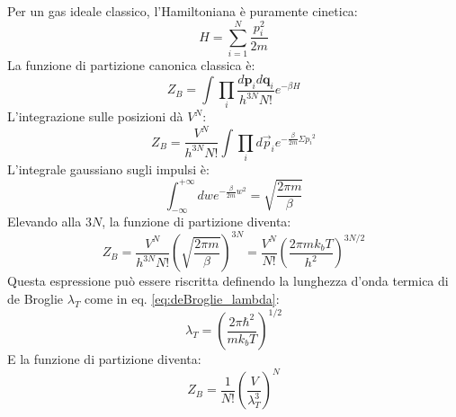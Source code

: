 Per un gas ideale classico, l'Hamiltoniana è puramente cinetica:
\begin{equation}
    H=\sum_{i=1}^{N}\frac{p_{i}^{2}}{2m}
    \label{eq:hamiltoniana_gas}
\end{equation}
La funzione di partizione canonica classica è:
\begin{equation}
    Z_{B}=\int\prod_{i}\frac{d\mathbf{p}_{i}d\mathbf{q}_{i}}{h^{3N}N!}e^{-\beta H}
    \label{eq:Z_B}
\end{equation}
L'integrazione sulle posizioni dà $V^N$:
\begin{equation}
    Z_{B}=\frac{V^{N}}{h^{3N}N!}\int\prod_{i}d\vec{p}_{i}e^{-\frac{\beta}{2m}\Sigma{p_{i}}^{2}}
    \label{eq:Z_B_V}
\end{equation}
L'integrale gaussiano sugli impulsi è:
\begin{equation}
    \int_{-\infty}^{+\infty}dwe^{-\frac{\beta}{2m}w^{2}}=\sqrt{\frac{2\pi m}{\beta}}
    \label{eq:gauss_integral}
\end{equation}
Elevando alla $3N$, la funzione di partizione diventa:
\begin{equation}
    Z_{B}=\frac{V^{N}}{h^{3N}N!}\left(\sqrt{\frac{2\pi m}{\beta}}\right)^{3N}=\frac{V^{N}}{N!}\left(\frac{2\pi mk_{b}T}{h^2}\right)^{3N/2}
    \label{eq:Z_B_finale}
\end{equation}
Questa espressione può essere riscritta definendo la lunghezza d'onda termica di de Broglie $\lambda_T$ come in eq. \ref{eq:deBroglie_lambda}:
\begin{equation}
    \lambda_T = \left(\frac{2\pi \hbar^2 }{mk_{b}T}\right)^{1/2}
\end{equation}
E la funzione di partizione diventa:
\begin{equation}
    Z_B = \frac{1}{N!}\left(\frac{V}{\lambda_T^3}\right)^N
    \label{eq:Z_B_lambda}
\end{equation}
